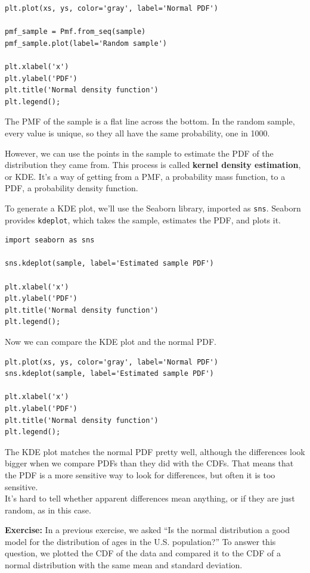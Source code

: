 \begin{lstlisting}[]
plt.plot(xs, ys, color='gray', label='Normal PDF')

pmf_sample = Pmf.from_seq(sample)
pmf_sample.plot(label='Random sample')

plt.xlabel('x')
plt.ylabel('PDF')
plt.title('Normal density function')
plt.legend();
\end{lstlisting}

The PMF of the sample is a flat line across the bottom. In the random
sample, every value is unique, so they all have the same probability,
one in 1000.

However, we can use the points in the sample to estimate the PDF of the
distribution they came from. This process is called \textbf{kernel
density estimation}, or KDE. It's a way of getting from a PMF, a
probability mass function, to a PDF, a probability density function.

To generate a KDE plot, we'll use the Seaborn library, imported as
\passthrough{\lstinline!sns!}. Seaborn provides
\passthrough{\lstinline!kdeplot!}, which takes the sample, estimates the
PDF, and plots it.

\begin{lstlisting}[]
import seaborn as sns

sns.kdeplot(sample, label='Estimated sample PDF')

plt.xlabel('x')
plt.ylabel('PDF')
plt.title('Normal density function')
plt.legend();
\end{lstlisting}

Now we can compare the KDE plot and the normal PDF.

\begin{lstlisting}[]
plt.plot(xs, ys, color='gray', label='Normal PDF')
sns.kdeplot(sample, label='Estimated sample PDF')

plt.xlabel('x')
plt.ylabel('PDF')
plt.title('Normal density function')
plt.legend();
\end{lstlisting}

The KDE plot matches the normal PDF pretty well, although the
differences look bigger when we compare PDFs than they did with the
CDFs. That means that the PDF is a more sensitive way to look for
differences, but often it is too sensitive.\\
It's hard to tell whether apparent differences mean anything, or if they
are just random, as in this case.

\textbf{Exercise:} In a previous exercise, we asked ``Is the normal
distribution a good model for the distribution of ages in the U.S.
population?'' To answer this question, we plotted the CDF of the data
and compared it to the CDF of a normal distribution with the same mean
and standard deviation.

